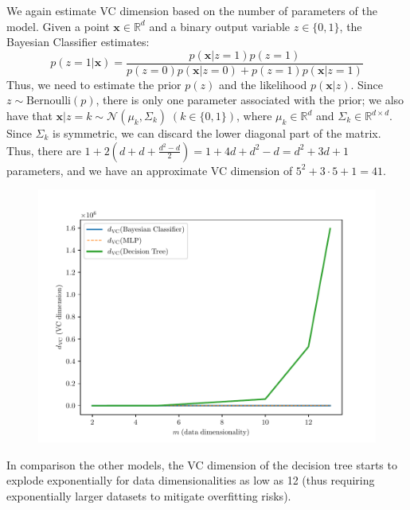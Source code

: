 \documentclass{exam}
\begin{document}
\begin{questions}
\begin{parts}
\begin{subparts}
                \item We again estimate VC dimension based on the number of parameters of the model. Given a point $\textbf{x} \in \mathbb{R}^{d}$ and a binary output variable $z \in \{0, 1\}$, the Bayesian Classifier estimates:
                \[
                    p(z = 1|\textbf{x}) = \frac{p(\textbf{x} | z = 1)p(z = 1)}{p(z = 0)p(\textbf{x} | z = 0) + p(z = 1)p(\textbf{x} | z = 1)}
                \] 
                Thus, we need to estimate the prior $p(z)$ and the likelihood $p(\textbf{x} | z)$. Since $z \sim \text{Bernoulli}(p)$, there is only one parameter associated with the prior; we also have that $\textbf{x}|z = k \sim \mathcal{N}(\mu_k, \Sigma_k) \; (k \in \{0,1\})$, where $\mu_k \in \mathbb{R}^{d}$ and $\Sigma_k \in \mathbb{R}^{d \times d}$. Since $\Sigma_k$ is symmetric, we can discard the lower diagonal part of the matrix. Thus, there are $1 + 2(d + d + \frac{d^2 - d}{2}) = 1 + 4d + d^2 - d = d^2 + 3d + 1$ parameters, and we have an approximate VC dimension of $5^2 + 3 \cdot 5 + 1 = 41$.
            \end{subparts}
            \pagebreak
            \item \quad
            \vspace{-3.0em}
            \begin{figure}[H]
                \centering
                \includegraphics[scale = 0.75]{vc_4_a.pdf}
            \end{figure}
            In comparison the other models, the VC dimension of the decision tree starts to explode exponentially for data dimensionalities as low as 12 (thus requiring exponentially larger datasets to mitigate overfitting risks).

\end{parts}
\end{questions}
\end{document}
